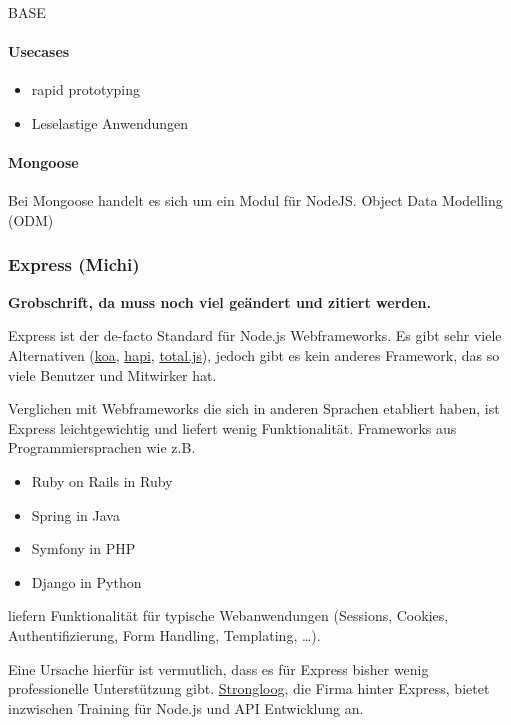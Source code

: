 \documentclass[]{article}
\begin{document}
BASE

\paragraph{Usecases}\label{usecases}

\begin{itemize}
\itemsep1pt\parskip0pt
\item
  rapid prototyping
\item
  Leselastige Anwendungen
\end{itemize}

\paragraph{Mongoose}\label{mongoose}

Bei Mongoose handelt es sich um ein Modul für NodeJS. Object Data
Modelling (ODM)

\subsubsection{Express (Michi)}\label{express-michi}

\textbf{Grobschrift, da muss noch viel geändert und zitiert werden.}

Express ist der de-facto Standard für Node.js Webframeworks. Es gibt
sehr viele Alternativen (\href{http://koajs.com/}{koa},
\href{http://hapijs.com/}{hapi},
\href{https://github.com/totaljs/framework}{total.js}), jedoch gibt es
kein anderes Framework, das so viele Benutzer und Mitwirker hat.

Verglichen mit Webframeworks die sich in anderen Sprachen etabliert
haben, ist Express leichtgewichtig und liefert wenig Funktionalität.
Frameworks aus Programmiersprachen wie z.B.

\begin{itemize}
\itemsep1pt\parskip0pt
\item
  Ruby on Rails in Ruby
\item
  Spring in Java
\item
  Symfony in PHP
\item
  Django in Python
\end{itemize}

liefern Funktionalität für typische Webanwendungen (Sessions, Cookies,
Authentifizierung, Form Handling, Templating, \ldots{}).

Eine Ursache hierfür ist vermutlich, dass es für Express bisher wenig
professionelle Unterstützung gibt.
\href{https://strongloop.com/node-js/training/}{Strongloog}, die Firma
hinter Express, bietet inzwischen Training für Node.js und API
Entwicklung an.
\end{document}
